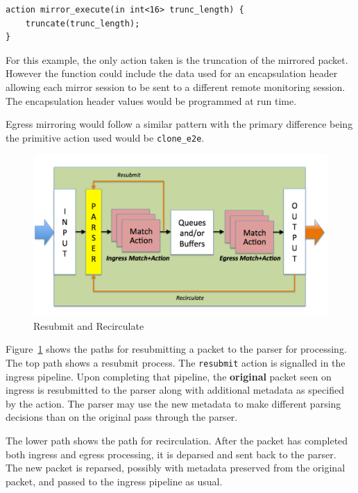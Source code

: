 \documentclass[12pt]{article}
\begin{document}
\begin{lstlisting}[style=P4style]
action mirror_execute(in int<16> trunc_length) {
    truncate(trunc_length);
}
\end{lstlisting}

For this example, the only action taken is the truncation of the mirrored 
packet. However the function could include the data used for an encapsulation 
header allowing each mirror session to be sent to a different remote monitoring 
session. The encapsulation header values would be programmed at run time.

Egress mirroring would follow a similar pattern with the primary difference 
being the primitive action used would be \texttt{clone_e2e}.


\begin{figure}[h!]
    \centering
    \includegraphics[width=\textwidth]{figures/recirculate.png}
    \caption{Resubmit and Recirculate}
    \label{fig:recirc}
\end{figure}

Figure~\ref{fig:recirc} shows the paths for resubmitting a packet to the parser for
processing.  The top path shows a resubmit process.  The
\texttt{resubmit} action is signalled in the ingress pipeline. Upon
completing that pipeline, the \textbf{original} packet seen on ingress
is resubmitted to the parser along with additional metadata as
specified by the action.  The parser may use the new metadata to make
different parsing decisions than on the original pass through the
parser.

The lower path shows the path for recirculation.  After the packet has
completed both ingress and egress processing, it is deparsed and sent
back to the parser.  The new packet is reparsed, possibly with
metadata preserved from the original packet, and passed to the ingress
pipeline as usual.
\end{document}
